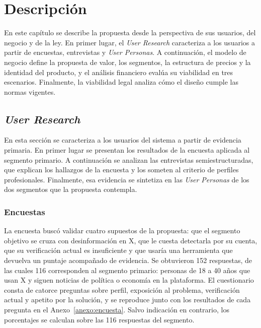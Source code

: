 \chapter{Descripción}
\label{ch:descripcion}

En este capítulo se describe la propuesta desde la perspectiva de sus usuarios, del negocio y de la ley. En primer lugar, el \textit{User Research} caracteriza a los usuarios a partir de encuestas, entrevistas y \textit{User Personas}. A continuación, el modelo de negocio define la propuesta de valor, los segmentos, la estructura de precios y la identidad del producto, y el análisis financiero evalúa su viabilidad en tres escenarios. Finalmente, la viabilidad legal analiza cómo el diseño cumple las normas vigentes.

\section{\textit{User Research}}

En esta sección se caracteriza a los usuarios del sistema a partir de evidencia primaria. En primer lugar se presentan los resultados de la encuesta aplicada al segmento primario. A continuación se analizan las entrevistas semiestructuradas, que explican los hallazgos de la encuesta y los someten al criterio de perfiles profesionales. Finalmente, esa evidencia se sintetiza en las \textit{User Personas} de los dos segmentos que la propuesta contempla.

\subsection{Encuestas}
\label{sec:encuestas}

La encuesta buscó validar cuatro supuestos de la propuesta: que el segmento objetivo se cruza con desinformación en X, que le cuesta detectarla por su cuenta, que su verificación actual es insuficiente y que usaría una herramienta que devuelva un puntaje acompañado de evidencia. Se obtuvieron 152 respuestas, de las cuales 116 corresponden al segmento primario: personas de 18 a 40 años que usan X y siguen noticias de política o economía en la plataforma. El cuestionario consta de catorce preguntas sobre perfil, exposición al problema, verificación actual y apetito por la solución, y se reproduce junto con los resultados de cada pregunta en el Anexo~\ref{anexo:encuesta}. Salvo indicación en contrario, los porcentajes se calculan sobre las 116 respuestas del segmento.

